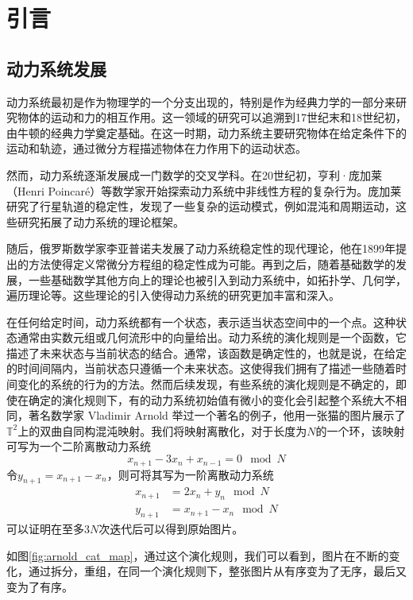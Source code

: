 \chapter{引言}\label{chap:introduction}
\section{动力系统发展}
动力系统最初是作为物理学的一个分支出现的，特别是作为经典力学的一部分来研究物体的运动和力的相互作用。这一领域的研究可以追溯到17世纪末和18世纪初，由牛顿的经典力学奠定基础。在这一时期，动力系统主要研究物体在给定条件下的运动和轨迹，通过微分方程描述物体在力作用下的运动状态。

然而，动力系统逐渐发展成一门数学的交叉学科。在20世纪初，亨利·庞加莱（Henri Poincaré）等数学家开始探索动力系统中非线性方程的复杂行为。庞加莱研究了行星轨道的稳定性，发现了一些复杂的运动模式，例如混沌和周期运动，这些研究拓展了动力系统的理论框架。

随后，俄罗斯数学家李亚普诺夫发展了动力系统稳定性的现代理论，他在1899年提出的方法使得定义常微分方程组的稳定性成为可能。再到之后，随着基础数学的发展，一些基础数学其他方向上的理论也被引入到动力系统中，如拓扑学、几何学，遍历理论等。这些理论的引入使得动力系统的研究更加丰富和深入。

在任何给定时间，动力系统都有一个状态，表示适当状态空间中的一个点。这种状态通常由实数元组或几何流形中的向量给出。动力系统的演化规则是一个函数，它描述了未来状态与当前状态的结合。通常，该函数是确定性的，也就是说，在给定的时间间隔内，当前状态只遵循一个未来状态\cite{enwiki:1216667016}。这使得我们拥有了描述一些随着时间变化的系统的行为的方法。然而后续发现，有些系统的演化规则是不确定的，即使在确定的演化规则下，有的动力系统初始值有微小的变化会引起整个系统大不相同，著名数学家 Vladimir Arnold 举过一个著名的例子，他用一张猫的图片展示了$\mathbb{T}^2$上的双曲自同构混沌映射。我们将映射离散化，对于长度为$N$的一个环，该映射可写为一个二阶离散动力系统
\begin{equation}
    x_{n+1}-3x_n+x_{n-1}=0 \mod N
\end{equation}
令$y_{n+1}=x_{n+1}-x_n$，则可将其写为一阶离散动力系统
\begin{equation}
    \begin{aligned}
        x_{n+1}&=2x_n+y_n \mod N\\
        y_{n+1}&=x_{n+1}-x_n \mod N
    \end{aligned}
\end{equation}
可以证明在至多$3N$次迭代后可以得到原始图片\cite{enwiki:1223508209}。

如图\ref{fig:arnold_cat_map}，通过这个演化规则，我们可以看到，图片在不断的变化，通过拆分，重组，在同一个演化规则下，整张图片从有序变为了无序，最后又变为了有序。

